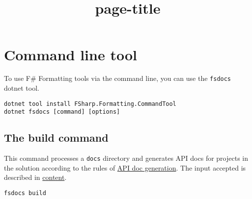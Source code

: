 \documentclass{article}
\title{{page-title}}
\date{}
\begin{document}
\maketitle

\section*{Command line tool}



To use F\# Formatting tools via the command line, you can use the \texttt{fsdocs} dotnet tool.
\begin{lstlisting}
dotnet tool install FSharp.Formatting.CommandTool
dotnet fsdocs [command] [options]

\end{lstlisting}
\subsection*{The build command}



This command processes a \texttt{docs} directory and generates API docs for projects in the solution according to the
rules of \href{apidocs.html}{API doc generation}. The input accepted is described in \href{content.html}{content}.
\begin{lstlisting}
fsdocs build

\end{lstlisting}
\end{document}

